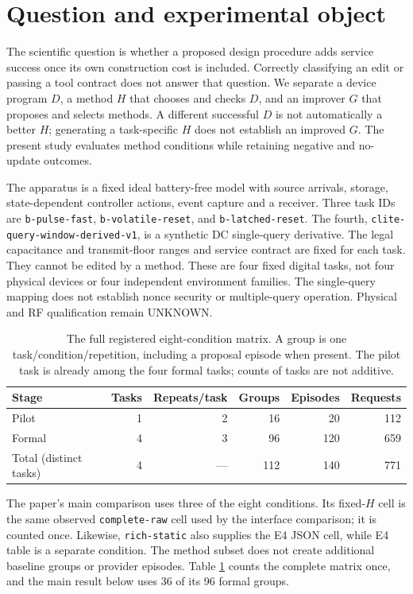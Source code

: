 \section{Question and experimental object}
The scientific question is whether a proposed design procedure adds service
success once its own construction cost is included. Correctly classifying an
edit or passing a tool contract does not answer that question. We separate a
device program $D$, a method $H$ that chooses and checks $D$, and an improver
$G$ that proposes and selects methods. A different successful $D$ is not
automatically a better $H$; generating a task-specific $H$ does not establish an
improved $G$. The present study evaluates method conditions while retaining
negative and no-update outcomes.

The apparatus is a fixed ideal battery-free model with source arrivals,
storage, state-dependent controller actions, event capture and a receiver.
Three task IDs are \texttt{b-pulse-fast}, \texttt{b-volatile-reset}, and
\texttt{b-latched-reset}. The fourth,
\texttt{clite-query-window-derived-v1}, is a synthetic DC single-query derivative.
The legal capacitance and transmit-floor ranges and service contract are fixed
for each task. They cannot be edited by a method. These are four fixed digital
tasks, not four physical devices or four independent environment families.
The single-query mapping does not establish nonce security or multiple-query
operation. Physical and RF qualification remain UNKNOWN.

\begin{table}[htbp]
\centering
\begin{tabular}{@{}lrrrrr@{}}
\toprule
Stage & Tasks & Repeats/task & Groups & Episodes & Requests \\
\midrule
Pilot & 1 & 2 & 16 & 20 & 112 \\
Formal & 4 & 3 & 96 & 120 & 659 \\
Total (distinct tasks) & 4 & --- & 112 & 140 & 771 \\
\bottomrule
\end{tabular}
\caption{The full registered eight-condition matrix. A group is one
task/condition/repetition, including a proposal episode when present. The pilot
task is already among the four formal tasks; counts of tasks are not additive.}
\label{tab:inventory}
\end{table}

The paper's main comparison uses three of the eight conditions. Its fixed-$H$
cell is the same observed \texttt{complete-raw} cell used by the interface
comparison; it is counted once. Likewise, \texttt{rich-static} also supplies
the E4 JSON cell, while E4 table is a separate condition. The method subset
does not create additional baseline groups or provider episodes. Table
\ref{tab:inventory} counts the complete matrix once, and the main result below
uses 36 of its 96 formal groups.

